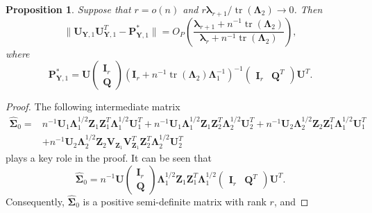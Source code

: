 \documentclass[12pt]{article} %
\DeclareMathOperator{\mytr}{tr}
\newcommand{\bQ}{\mathbf{Q}}
\newcommand{\bZ}{\mathbf{Z}}
\newcommand{\bP}{\mathbf{P}}
\newcommand{\bY}{\mathbf{Y}}
\newcommand{\bI}{\mathbf{I}}
\newcommand{\bU}{\mathbf{U}}
\newcommand{\bV}{\mathbf{V}}
\newcommand{\bfsym}[1]{\ensuremath{\boldsymbol{#1}}}
\def\blambda {\bfsym {\lambda}}
\def\bLambda {\bfsym {\Lambda}}
\def\bSigma {\bfsym {\Sigma}}
\newtheorem{proposition}{Proposition}
\theoremstyle{definition}
\begin{document}
\begin{appendices}
\begin{proposition}\label{newEigenvectorProp}
    Suppose that $r=o(n)$ and $r\blambda_{r+1} /\mytr(\bLambda_2)\to 0$. Then
    \begin{equation*}
        \|\bU_{\bY,1}\bU_{\bY,1}^T -\bP_{\bY,1}^* \|
        =O_P\left(\frac{\blambda_{r+1}+n^{-1}\mytr(\bLambda_2)}{\blambda_r +n^{-1}\mytr(\bLambda_2)}\right),
    \end{equation*}
    where
    \begin{equation*}
        \bP_{\bY,1}^*=
    \bU
    \begin{pmatrix}
       \bI_r \\
       \bQ
    \end{pmatrix}
    \left(\bI_r+ n^{-1}\mytr(\bLambda_2)\bLambda_1^{-1}\right)^{-1}
    \begin{pmatrix}
        \bI_r
          &
          \bQ^T
        \end{pmatrix}
        \bU^T.
    \end{equation*}
\end{proposition}
\begin{proof}
    The following intermediate matrix
    \begin{equation*}
        \begin{split}
    \hat{\bSigma}_0 =&
    n^{-1}\bU_1 \bLambda_1^{1/2} \bZ_1 \bZ_1^T \bLambda_1^{1/2}\bU_1^T
    +n^{-1}\bU_1 \bLambda_1^{1/2} \bZ_1 \bZ_2^T \bLambda_2^{1/2}\bU_2^T
    +n^{-1}\bU_2 \bLambda_2^{1/2} \bZ_2 \bZ_1^T \bLambda_1^{1/2}\bU_1^T
    \\
    &+n^{-1}\bU_2 \bLambda_2^{1/2} \bZ_2 \bV_{\bZ_1}\bV_{\bZ_1}^T
    \bZ_2^T \bLambda_2^{1/2}\bU_2^T
        \end{split}
    \end{equation*}
    plays a key role in the proof.
    It can be seen that 
    \begin{equation*}
        \hat{\bSigma}_0=n^{-1}
    \bU
    \begin{pmatrix}
       \bI_r \\
       \bQ
    \end{pmatrix}
    \bLambda_1^{1/2}\bZ_1 \bZ_1^T\bLambda_1^{1/2}
    \begin{pmatrix}
        \bI_r
          &
          \bQ^T
        \end{pmatrix}
        \bU^T.
    \end{equation*}
    Consequently, $\hat{\bSigma}_0$ is a positive semi-definite matrix with rank $r$, and 

\end{proof}
\end{appendices}
\end{document}
